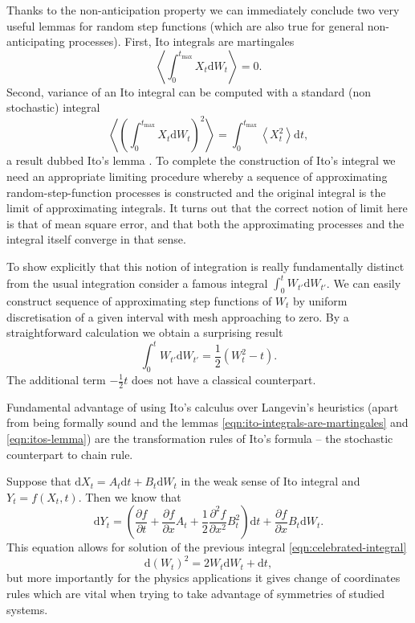 \documentclass{doctoral}
\newcommand{\pd}{\partial}
\newcommand{\dd}{\mathrm{d}}
\begin{document}
Thanks to the non-anticipation property we can immediately conclude two very useful lemmas for random step functions (which are also true for general non-anticipating processes).
First, Ito integrals are martingales
\begin{equation}
    \left< \int_0^{t_{\mathrm{max}}} X_t \dd W_t \right> = 0.
    \label{eqn:ito-integrals-are-martingales}
\end{equation}
Second, variance of an Ito integral can be computed with a standard (non stochastic) integral
\begin{equation}
    \left< \left( \int_0^{t_{\mathrm{max}}} X_t \dd W_t \right)^2 \right> = \int_{0}^{t_{\mathrm{max}}} \left< X_t^2 \right> \dd t, \label{eqn:itos-lemma}
\end{equation}
a result dubbed Ito's lemma \cite{Ito_1951}.
To complete the construction of Ito's integral we need an appropriate limiting procedure whereby a sequence of approximating random-step-function processes is constructed and the original integral is the limit of approximating integrals.
It turns out that the correct notion of limit here is that of mean square error, and that both the approximating processes and the integral itself converge in that sense.

To show explicitly that this notion of integration is really fundamentally distinct from the usual integration consider a famous integral $\int_0^t W_{t'} \dd W_{t'}$.
We can easily construct sequence of approximating step functions of $W_{t}$ by uniform discretisation of a given interval with mesh approaching to zero.
By a straightforward calculation we obtain a surprising result
\begin{equation}
    \int_{0}^{t} W_{t'} \dd W_{t'} = \frac{1}{2} \left( W_t^2 - t \right).
    \label{eqn:celebrated-integral}
\end{equation}
The additional term $-\frac{1}{2}t$ does not have a classical counterpart.

Fundamental advantage of using Ito's calculus over Langevin's heuristics (apart from being formally sound and the lemmas \eqref{eqn:ito-integrals-are-martingales} and \eqref{eqn:itos-lemma}) are the transformation rules of Ito's formula -- the stochastic counterpart to chain rule.

Suppose that $\dd X_t = A_t \dd t + B_t \dd W_t$ in the weak sense of Ito integral and $Y_t = f(X_t,t)$.
Then we know that
\begin{equation}
    \dd Y_t = \left( \frac{\pd f}{\pd t} + \frac{\pd f}{\pd x} A_t + \frac{1}{2} \frac{\pd^2 f}{\pd x^2} B_t^2 \right) \dd t + \frac{\pd f}{\pd x} B_t \dd W_t.
    \label{eqn:itos-formula}
\end{equation}
This equation allows for solution of the previous integral \eqref{eqn:celebrated-integral}
\begin{equation}
    \dd (W_t)^2 = 2 W_t \dd W_t + \dd t, \label{eqn:ito-formula-applied}
\end{equation}
but more importantly for the physics applications it gives change of coordinates rules which are vital when trying to take advantage of symmetries of studied systems.
\end{document}

